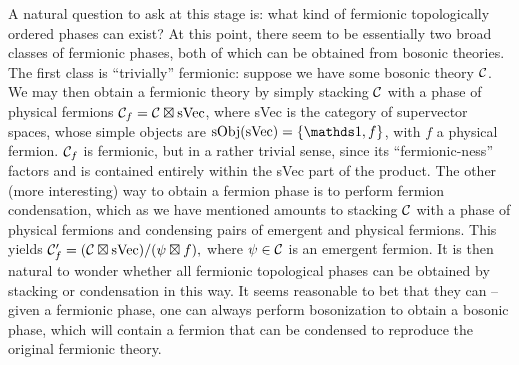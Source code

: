 A natural question to ask at this stage is: what kind of fermionic topologically ordered phases can exist? 
At this point, there seem to be essentially two broad classes of fermionic phases, both of which can be obtained from bosonic theories. 
The first class is ``trivially'' fermionic: suppose we have some bosonic theory $\mathcal{C}$. 
We may then obtain a fermionic theory by simply stacking $\mathcal{C}$ with a phase of physical fermions $\mathcal{C}_{f} = \mathcal{C} \boxtimes {\rm sVec}$, where sVec is the category of supervector spaces, whose simple objects are ${\rm sObj}({\rm sVec}) = \{\unit,f\}$, with $f$ a physical fermion. 
$\mathcal{C}_f$ is fermionic, but in a rather trivial sense, since its ``fermionic-ness'' factors and is contained entirely within the sVec part of the product. 
The other (more interesting) way to obtain a fermion phase is to perform fermion condensation, which as we have 
mentioned amounts to stacking $\mathcal{C}$ with a phase of physical fermions and condensing pairs of emergent and physical fermions. 
This yields $\mathcal{C}_f' = (\mathcal{C} \boxtimes {\rm sVec}) / (\psi \boxtimes f),$
where $\psi \in \mathcal{C}$ is an emergent fermion. 
It is then natural to wonder whether all fermionic topological phases can be obtained by stacking or condensation in this way. 
It seems reasonable to bet that they can -- given a fermionic phase, one can always perform bosonization 
to obtain a bosonic phase, which will contain a fermion that can be condensed to reproduce the 
original fermionic theory. 



